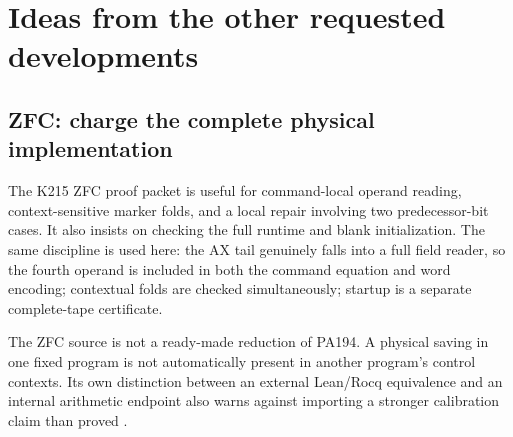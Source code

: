 \documentclass[11pt,a4paper]{article}
\begin{document}
\clearpage






\clearpage














\clearpage






\section{Ideas from the other requested developments}

\subsection{ZFC: charge the complete physical implementation}

The K215 ZFC proof packet is useful for command-local operand reading,
context-sensitive marker folds, and a local repair involving two
predecessor-bit cases. It also insists on checking the full runtime
and blank initialization\cite{zfc-k215}. The same discipline is used
here: the AX tail genuinely falls into a full field reader, so the
fourth operand is included in both the command equation and word
encoding; contextual folds are checked simultaneously; startup is a
separate complete-tape certificate.

The ZFC source is not a ready-made reduction of PA194. A physical
saving in one fixed program is not automatically present in another
program's control contexts. Its own distinction between an external
Lean/Rocq equivalence and an internal arithmetic endpoint also warns
against importing a stronger calibration claim than proved
\cite{zfc-status}.
\end{document}
